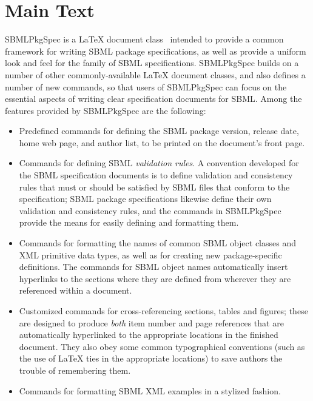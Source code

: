 \documentclass{bmcart}
\newcommand{\sbmlpkg}{SBMLPkgSpec}
\begin{document}
\section*{Main Text}

\sbmlpkg{} is a LaTeX document class~\cite{lamport1994} intended to provide a common framework for writing SBML package specifications, as well as provide a uniform look and feel for the family of SBML specifications.  \sbmlpkg{} builds on a number of other commonly-available LaTeX document classes, and also defines a number of new commands, so that users of \sbmlpkg{} can focus on the essential aspects of writing clear specification documents for SBML.  Among the features provided by \sbmlpkg{} are the following:

\begin{itemize}

\item Predefined commands for defining the SBML package version, release date, home web page, and author list, to be printed on the document's front page.

\item Commands for defining SBML \emph{validation rules}.  A convention developed for the SBML specification documents is to define validation and consistency rules that must or should be satisfied by SBML files that conform to the specification; SBML package specifications likewise define their own validation and consistency rules, and the commands in \sbmlpkg{} provide the means for easily defining and formatting them.

\item Commands for formatting the names of common SBML object classes and XML primitive data types, as well as for creating new package-specific definitions.  The commands for SBML object names automatically insert hyperlinks to the sections where they are defined from wherever they are  referenced within a document.

\item Customized commands for cross-referencing sections, tables and figures; these are designed to produce \emph{both} item number and page references that are automatically hyperlinked to the appropriate locations in the finished document. They also obey some common typographical conventions (such as the use of LaTeX ties in the appropriate locations) to save authors the trouble of remembering them.

\item Commands for formatting SBML XML examples in a stylized fashion.


\end{itemize}
\end{document}
